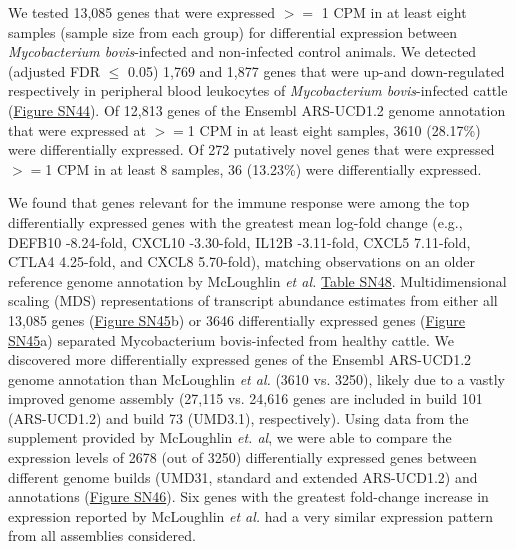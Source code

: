 \documentclass[../main.tex]{subfiles}
\begin{document}
\begin{flushleft}
We tested 13,085 genes that were expressed $>=$ 1 CPM in at least eight samples (sample size from each group) for differential expression between \emph{Mycobacterium bovis}-infected and non-infected control animals. We detected (adjusted FDR $≤$ 0.05) 1,769 and 1,877 genes that were up-and down-regulated respectively in peripheral blood leukocytes of \emph{Mycobacterium bovis}-infected cattle (\hyperlink{Figure SN44}{Figure SN44}). Of 12,813 genes of the Ensembl ARS-UCD1.2 genome annotation that were expressed at $>=$1 CPM in at least eight samples, 3610 (28.17\%) were differentially expressed. Of 272 putatively novel genes that were expressed $>=$1 CPM in at least 8 samples, 36 (13.23\%) were differentially expressed.

\bigskip


We found that genes relevant for the immune response were among the top differentially expressed genes with the greatest mean log-fold change (e.g., DEFB10 -8.24-fold, CXCL10 -3.30-fold, IL12B -3.11-fold, CXCL5 7.11-fold, CTLA4 4.25-fold, and CXCL8 5.70-fold), matching observations on an older reference genome annotation by McLoughlin \emph{et al.} \hyperlink{Table SN48}{Table SN48}. Multidimensional scaling (MDS) representations of transcript abundance estimates from either all 13,085 genes (\hyperlink{Figure SN45}{Figure SN45}b) or 3646 differentially expressed genes (\hyperlink{Figure SN45}{Figure SN45}a) separated Mycobacterium bovis-infected from healthy cattle. We discovered more differentially expressed genes of the Ensembl ARS-UCD1.2 genome annotation than McLoughlin \emph{et al.} (3610 vs. 3250), likely due to a vastly improved genome assembly (27,115 vs. 24,616 genes are included in build 101 (ARS-UCD1.2) and build 73 (UMD3.1), respectively). Using data from the supplement provided by McLoughlin \emph{et. al}, we were able to compare the expression levels of 2678 (out of 3250) differentially expressed genes between different genome builds (UMD31, standard and extended ARS-UCD1.2) and annotations (\hyperlink{Figure SN46}{Figure SN46}). Six genes with the greatest fold-change increase in expression reported by McLoughlin \emph{et al.} had a very similar expression pattern from all assemblies considered.


\bigskip 


\end{flushleft}
\end{document}
